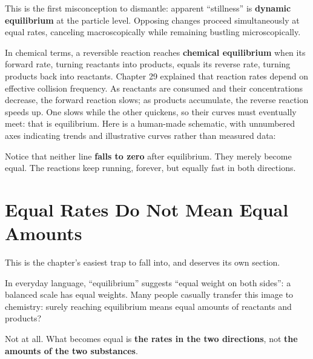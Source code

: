 This is the first misconception to dismantle: apparent ``stillness'' is \textbf{dynamic equilibrium} at the particle level. Opposing changes proceed simultaneously at equal rates, canceling macroscopically while remaining bustling microscopically.

In chemical terms, a reversible reaction reaches \textbf{chemical equilibrium} when its forward rate, turning reactants into products, equals its reverse rate, turning products back into reactants. Chapter 29 explained that reaction rates depend on effective collision frequency. As reactants are consumed and their concentrations decrease, the forward reaction slows; as products accumulate, the reverse reaction speeds up. One slows while the other quickens, so their curves must eventually meet: that is equilibrium. Here is a human-made schematic, with unnumbered axes indicating trends and illustrative curves rather than measured data:

\begin{center}
\end{center}

Notice that neither line \textbf{falls to zero} after equilibrium. They merely become equal. The reactions keep running, forever, but equally fast in both directions.

\section{Equal Rates Do Not Mean Equal Amounts}

This is the chapter's easiest trap to fall into, and deserves its own section.

In everyday language, ``equilibrium'' suggests ``equal weight on both sides'': a balanced scale has equal weights. Many people casually transfer this image to chemistry: surely reaching equilibrium means equal amounts of reactants and products?

Not at all. What becomes equal is \textbf{the rates in the two directions}, not \textbf{the amounts of the two substances}.

